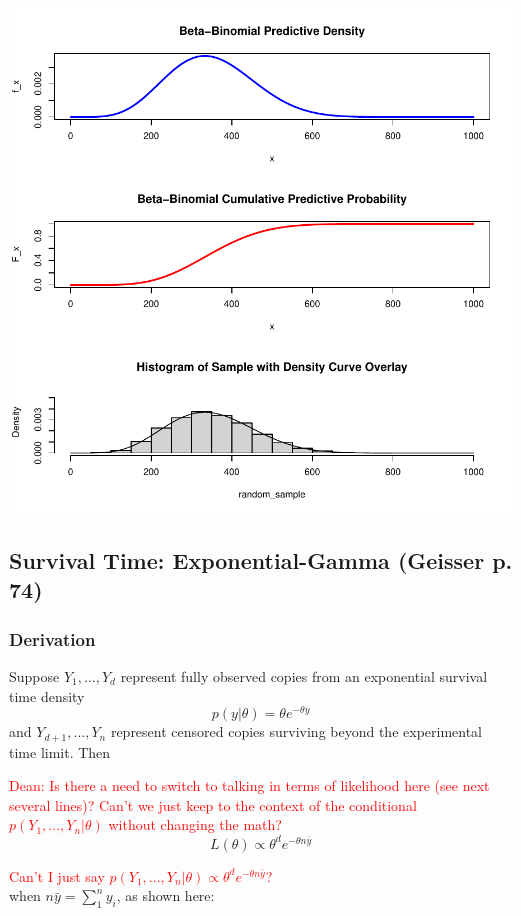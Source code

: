 \documentclass[12pt, a4paper]{article}
\begin{document}
\includegraphics{Thesis_v1-003}


    \subsection{Survival Time:  Exponential-Gamma (Geisser p. 74)}
    \subsubsection{Derivation}

      Suppose $Y_1,...,Y_d$ represent fully observed copies from an exponential survival time density
          $$p(y|\theta) = \theta e^{-\theta y}$$
      and $Y_{d+1},...,Y_n$ represent censored copies surviving beyond the experimental time limit.  Then

      \textcolor{red}{Dean:  Is there a need to switch to talking in terms of likelihood here (see next several lines)?  Can't we just keep to the context of the conditional $p(Y_1,...,Y_n|\theta)$ without changing the math?}
          $$L(\theta)\propto\theta^d e^{-\theta n\bar{y}}$$

          \textcolor{red}{Can't I just say $p(Y_1,...,Y_n|\theta)\propto\theta^d e^{-\theta n\bar{y}}$?}\\

      when $n\bar{y} = \sum_1^n{y_i}$, as shown here:\\
\end{document}

